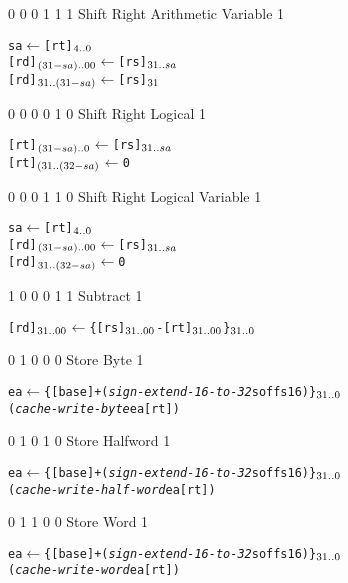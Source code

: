     {0 0 0 1 1 1}    {Shift Right Arithmetic Variable} {1}    {\MIPSTag}
\begin{alltt}
        sa           \(\leftarrow\) [rt]\(\sb{4..0}\)
        [rd]\({\sb{(31-sa)..00}}\) \(\leftarrow\) [rs]\({\sb{31..sa}}\)
        [rd]\({\sb{31..(31-sa)}}\) \(\leftarrow\) [rs]\({\sb{31}}\)
\end{alltt}\rawInstrEnd

    {0 0 0 0 1 0}    {Shift Right Logical}              {1}    {\MIPSTag}
\begin{alltt}
        [rt]\({\sb{(31-sa)..0}}\) \hspace{.5mm} \(\leftarrow\) [rs]\({\sb{31..sa}}\)
        [rt]\({\sb{(31..(32-sa)}}\) \(\leftarrow\) 0
\end{alltt}\rawInstrEnd

    {0 0 0 1 1 0}    {Shift Right Logical Variable}              {1}    {\MIPSTag}
\begin{alltt}
        sa           \(\leftarrow\) [rt]\(\sb{4..0}\)
        [rd]\({\sb{(31-sa)..00}}\) \(\leftarrow\) [rs]\({\sb{31..sa}}\)
        [rd]\({\sb{31..(32-sa)}}\) \(\leftarrow\) 0
\end{alltt}\rawInstrEnd

   {1 0 0 0 1 1}    {Subtract}                           {1}    {\MIPSTag}
\begin{alltt}
        [rd]\({\sb{31..00}}\) \(\leftarrow\) \{ [rs]\({\sb{31..00}}\) - [rt]\({\sb{31..00}}\) \}\(\sb{31..0}\)
\end{alltt}\rawInstrEnd

     {0 1 0 0 0}    {Store Byte}               {1} {\MIPSTag}
\begin{alltt}
        ea    \(\leftarrow\) \{ [base] + ({\em{sign-extend-16-to-32}} soffs16) \}\(\sb{31..0}\)
        ({\em{cache-write-byte}} ea [rt])
\end{alltt}\rawInstrEnd

     {0 1 0 1 0}    {Store Halfword}           {1} {\MIPSTag}
\begin{alltt}
        ea    \(\leftarrow\) \{ [base] + ({\em{sign-extend-16-to-32}} soffs16) \}\(\sb{31..0}\)
        ({\em{cache-write-half-word}} ea [rt])
\end{alltt}\rawInstrEnd

     {0 1 1 0 0}    {Store Word}               {1} {\MIPSTag}
\begin{alltt}
        ea    \(\leftarrow\) \{ [base] + ({\em{sign-extend-16-to-32}} soffs16) \}\(\sb{31..0}\)
        ({\em{cache-write-word}} ea [rt])
\end{alltt}\rawInstrEnd


